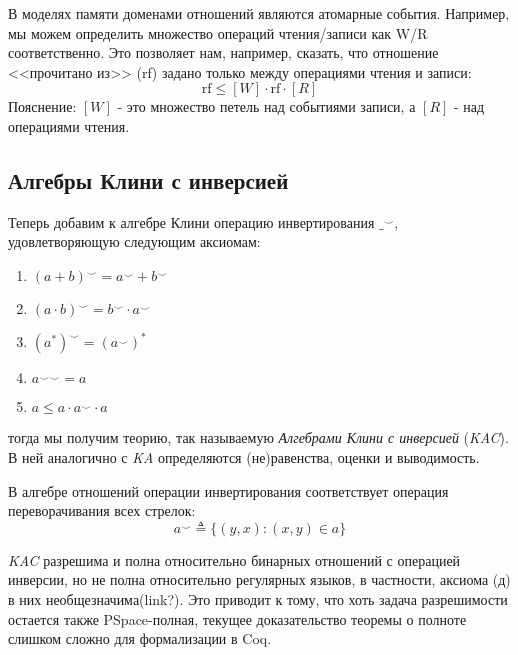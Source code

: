 \documentclass[times
              ]{itmo-student-thesis}
\begin{document}
      В моделях памяти доменами отношений являются атомарные события. Например, мы можем определить множество
      операций чтения/записи как W/R соответственно.
      Это позволяет нам, например, сказать, что отношение <<прочитано из>> (rf) задано только между
      операциями чтения и записи\cite{rc11}:
      $$ \text{rf} \leq [W] \cdot \text{rf} \cdot [R] $$
      Пояснение: $ [W] $ - это множество петель над событиями записи, а $[R]$ - над операциями чтения.


    \subsection{Алгебры Клини с инверсией}
      Теперь добавим к алгебре Клини операцию инвертирования $ \_^{\smile} $, удовлетворяющую следующим аксиомам:
      \begin{enumerate}
        \item $ (a + b)^{\smile} = a^{\smile} + b^{\smile} $
        \item $ (a \cdot b)^{\smile} = b^{\smile} \cdot a^{\smile} $
        \item $ (a^*)^{\smile} = (a^{\smile})^* $
        \item $ {a^{\smile}}^{\smile} = a $
        \item $ a \leq a \cdot a^{\smile} \cdot a $
      \end{enumerate}
      тогда мы получим теорию, так называемую \textit{Алгебрами Клини с инверсией} (\textit{KAC}).
      В ней аналогично с \textit{KA} определяются (не)равенства, оценки и выводимость.

      В алгебре отношений операции инвертирования соответствует операция переворачивания всех стрелок:
      $$ a^\smile \triangleq \{ (y, x): (x, y) \in a \} $$

      \textit{KAC} разрешима и полна относительно бинарных отношений с операцией инверсии, но не полна
      относительно регулярных языков, в частности, аксиома (д) в них необщезначима(link?).
      Это приводит к тому, что хоть задача разрешимости остается также PSpace-полная, текущее
      доказательство теоремы о полноте слишком сложно для формализации в Coq\cite{AlgebrasOfRelation}.
\end{document}
